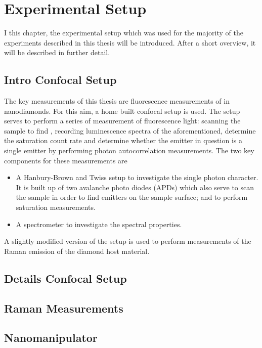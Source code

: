 
\chapter{Experimental Setup}	\label{ch::experimental_setup}

	I this chapter, the experimental setup which was used for the majority of the experiments described in this thesis will be introduced. 
	After a short overview, it will be described in further detail.

	\section{Intro Confocal Setup}

	The key measurements of this thesis are fluorescence measurements of \sivs in nanodiamonds.
	For this aim, a home built confocal setup is used.
	The setup serves to perform a series of measurement of fluorescence light: scanning the sample to find \sivs, recording luminescence spectra of the aforementioned, determine the saturation count rate and determine whether the emitter in question is a single emitter by performing photon autocorrelation measurements.
	The two key components for these measurements are 

	\begin{itemize}
		\item A Hanbury-Brown and Twiss setup to investigate the single photon character. It is built up of two avalanche photo diodes (APDs) which also serve to scan the sample in order to find emitters on the sample surface; and to perform saturation measurements.
		\item A spectrometer to investigate the spectral properties.
	\end{itemize}
	
	A slightly modified version of the setup is used to perform measurements of the Raman emission of the diamond host material.

	\section{Details Confocal Setup}

	\section{Raman Measurements}
	\section{Nanomanipulator}

